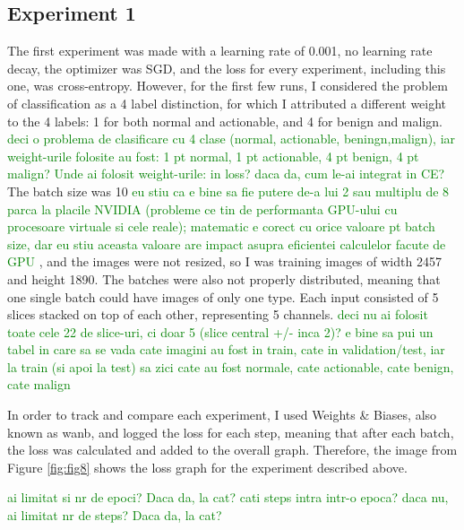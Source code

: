\subsection{Experiment 1}

The first experiment was made with a learning rate of 0.001, no learning rate decay, the optimizer was SGD, and the loss for every experiment, including this one, was cross-entropy. However, for the first few runs, I considered the problem of classification as a 4 label distinction, for which I attributed a different weight to the 4 labels: 1 for both normal and actionable, and 4 for benign and malign. 
\textcolor{green}{deci o problema de clasificare cu 4 clase (normal, actionable, beningn,malign), iar weight-urile folosite au fost: 1 pt normal, 1 pt actionable, 4 pt benign, 4 pt malign? Unde ai folosit weight-urile: in loss? daca da, cum le-ai integrat in CE?}
The batch size was 10
\textcolor{green}{eu stiu ca e bine sa fie putere de-a lui 2 sau multiplu de 8 parca la placile NVIDIA (probleme ce tin de performanta GPU-ului  cu procesoare virtuale si cele reale); matematic e corect cu orice valoare pt batch size, dar eu stiu aceasta valoare are impact asupra eficientei calculelor facute de GPU}
, and the images were not resized, so I was training images of width 2457 and height 1890. The batches were also not properly distributed, meaning that one single batch could have images of only one type. Each input consisted of 5 slices stacked on top of each other, representing 5 channels.
\textcolor{green}{deci nu ai folosit toate cele 22 de slice-uri, ci doar 5 (slice central +/- inca 2)?}
\textcolor{green}{e bine sa pui un tabel in care sa se vada cate imagini au fost in train, cate in validation/test, iar la train (si apoi la test) sa zici cate au fost normale, cate actionable, cate benign, cate malign} 

In order to track and compare each experiment, I used Weights \& Biases, also known as wanb, and logged the loss for each step, meaning that after each batch, the loss was calculated and added to the overall graph. Therefore, the image from Figure \ref{fig:fig8} shows the loss graph for the experiment described above.

\textcolor{green}{ai limitat si nr de epoci? Daca da, la cat? cati steps intra intr-o epoca? daca nu, ai limitat nr de steps? Daca da, la cat?}

